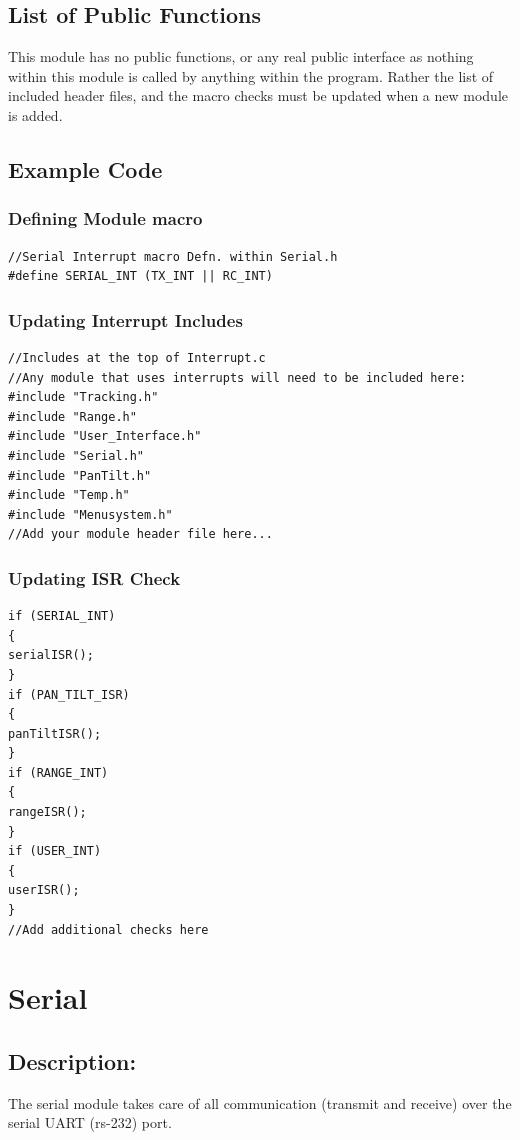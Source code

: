\documentclass[]{report}
\begin{document}
\section{List of Public Functions}
This module has no public functions, or any real public interface as nothing within this module is called by anything within the program. Rather the list of included header files, and the macro checks must be updated when a new module is added.

\section{Example Code}
\subsection{Defining Module macro}
\begin{lstlisting}
//Serial Interrupt macro Defn. within Serial.h
#define SERIAL_INT (TX_INT || RC_INT)
\end{lstlisting}

\subsection{Updating Interrupt Includes}
\begin{lstlisting}
//Includes at the top of Interrupt.c
//Any module that uses interrupts will need to be included here:
#include "Tracking.h"
#include "Range.h"
#include "User_Interface.h"
#include "Serial.h"
#include "PanTilt.h"
#include "Temp.h"
#include "Menusystem.h"
//Add your module header file here...
\end{lstlisting}

\subsection{Updating ISR Check}
\begin{lstlisting}
if (SERIAL_INT)
{
serialISR();
}
if (PAN_TILT_ISR)
{
panTiltISR();
}
if (RANGE_INT)
{
rangeISR();
}
if (USER_INT)
{
userISR();
}
//Add additional checks here
\end{lstlisting}

\chapter{Serial}
\section{Description:}
The serial module takes care of all communication (transmit and receive) over the serial UART (rs-232) port.
\end{document}
